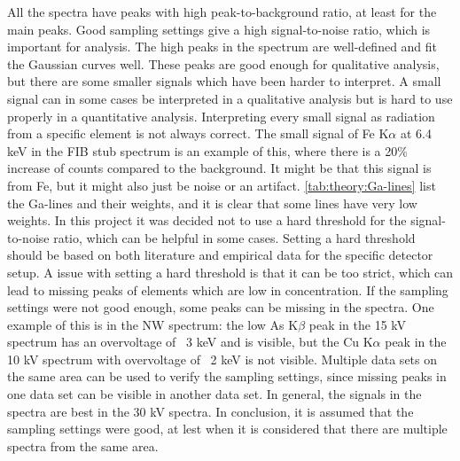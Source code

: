 All the spectra have peaks with high peak-to-background ratio, at least for the main peaks. %
Good sampling settings give a high signal-to-noise ratio, which is important for analysis.
The high peaks in the spectrum are well-defined and fit the Gaussian curves well.
These peaks are good enough for qualitative analysis, but there are some smaller signals which have been harder to interpret.
A small signal can in some cases be interpreted in a qualitative analysis but is hard to use properly in a quantitative analysis.
Interpreting every small signal as radiation from a specific element is not always correct.
The small signal of Fe K$\alpha$ at 6.4 keV in the FIB stub spectrum is an example of this, where there is a 20\% increase of counts compared to the background.
It might be that this signal is from Fe, but it might also just be noise or an artifact.
\cref{tab:theory:Ga-lines} list the Ga-lines and their weights, and it is clear that some lines have very low weights.
In this project it was decided not to use a hard threshold for the signal-to-noise ratio, which can be helpful in some cases.
Setting a hard threshold should be based on both literature and empirical data for the specific detector setup.
A issue with setting a hard threshold is that it can be too strict, which can lead to missing peaks of elements which are low in concentration.
If the sampling settings were not good enough, some peaks can be missing in the spectra.
One example of this is in the NW spectrum: the low As K$\beta$ peak in the 15 kV spectrum has an overvoltage of ~3 keV and is visible, but the Cu K$\alpha$ peak in the 10 kV spectrum with overvoltage of ~2 keV is not visible.
Multiple data sets on the same area can be used to verify the sampling settings, since missing peaks in one data set can be visible in another data set.
In general, the signals in the spectra are best in the 30 kV spectra.
In conclusion, it is assumed that the sampling settings were good, at lest when it is considered that there are multiple spectra from the same area.


